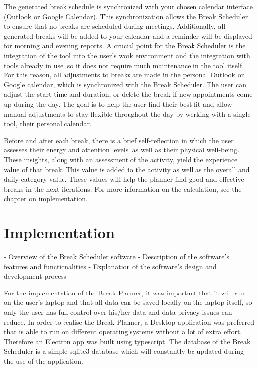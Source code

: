 \documentclass{hasel_thesis}
\begin{document}
The generated break schedule is synchronized with your chosen calendar interface (Outlook or Google Calendar). This synchronization allows the Break Scheduler to ensure that no breaks are scheduled during meetings. Additionally, all generated breaks will be added to your calendar and a reminder will be displayed for morning and evening reports. A crucial point for the Break Scheduler is the integration of the tool into the user's work environment and the integration with tools already in use, so it does not require much maintenance in the tool itself. For this reason, all adjustments to breaks are made in the personal Outlook or Google calendar, which is synchronized with the Break Scheduler. The user can adjust the start time and duration, or delete the break if new appointments come up during the day.
The goal is to help the user find their best fit and allow manual adjustments to stay flexible throughout the day by working with a single tool, their personal calendar.

Before and after each break, there is a brief self-reflection in which the user assesses their energy and attention levels, as well as their physical well-being. These insights, along with an assessment of the activity, yield the experience value of that break. This value is added to the activity as well as the overall and daily category value. These values will help the planner find good and effective breaks in the next iterations. For more information on the calculation, see the chapter on implementation.



\chapter{Implementation}
- Overview of the Break Scheduler software
- Description of the software's features and functionalities
- Explanation of the software's design and development process

For the implementation of the Break Planner, it was important that it will run on the user's laptop and that all data can be saved locally on the laptop itself, so only the user has full control over his/her data and data privacy issues can reduce. In order to realise the Break Planner, a Desktop application was preferred that is able to run on different operating systems without a lot of extra effort. Therefore an Electron app was built using typescript. The database of the Break Scheduler is a simple sqlite3 database which will constantly be updated during the use of the application. 
\end{document}
